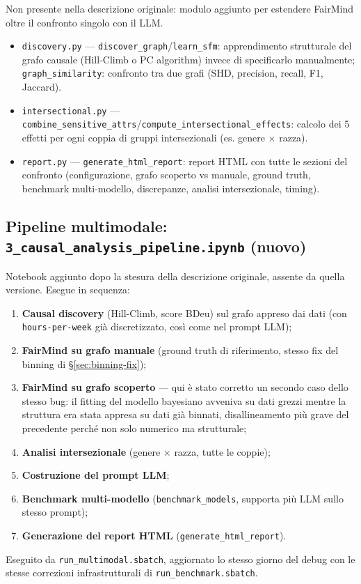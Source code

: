 Non presente nella descrizione originale: modulo aggiunto per estendere FairMind oltre il confronto singolo con il LLM.

\begin{itemize}
  \item \texttt{discovery.py} --- \texttt{discover\_graph}/\texttt{learn\_sfm}: apprendimento strutturale del grafo causale (Hill-Climb o PC algorithm) invece di specificarlo manualmente; \texttt{graph\_similarity}: confronto tra due grafi (SHD, precision, recall, F1, Jaccard).
  \item \texttt{intersectional.py} --- \texttt{combine\_sensitive\_attrs}/\texttt{compute\_intersectional\_effects}: calcolo dei 5 effetti per ogni coppia di gruppi intersezionali (es. genere $\times$ razza).
  \item \texttt{report.py} --- \texttt{generate\_html\_report}: report HTML con tutte le sezioni del confronto (configurazione, grafo scoperto vs manuale, ground truth, benchmark multi-modello, discrepanze, analisi intersezionale, timing).
\end{itemize}

\subsection{Pipeline multimodale: \texttt{3\_causal\_analysis\_pipeline.ipynb} (nuovo)}
\label{sec:pipeline}

Notebook aggiunto dopo la stesura della descrizione originale, assente da quella versione. Esegue in sequenza:
\begin{enumerate}
  \item \textbf{Causal discovery} (Hill-Climb, score BDeu) sul grafo appreso dai dati (con \texttt{hours-per-week} gi\`a discretizzato, cos\`i come nel prompt LLM);
  \item \textbf{FairMind su grafo manuale} (ground truth di riferimento, stesso fix del binning di \S\ref{sec:binning-fix});
  \item \textbf{FairMind su grafo scoperto} --- qui \`e stato corretto un secondo caso dello stesso bug: il fitting del modello bayesiano avveniva su dati grezzi mentre la struttura era stata appresa su dati gi\`a binnati, disallineamento pi\`u grave del precedente perch\'e non solo numerico ma strutturale;
  \item \textbf{Analisi intersezionale} (genere $\times$ razza, tutte le coppie);
  \item \textbf{Costruzione del prompt LLM};
  \item \textbf{Benchmark multi-modello} (\texttt{benchmark\_models}, supporta pi\`u LLM sullo stesso prompt);
  \item \textbf{Generazione del report HTML} (\texttt{generate\_html\_report}).
\end{enumerate}
Eseguito da \texttt{run\_multimodal.sbatch}, aggiornato lo stesso giorno del debug con le stesse correzioni infrastrutturali di \texttt{run\_benchmark.sbatch}.


